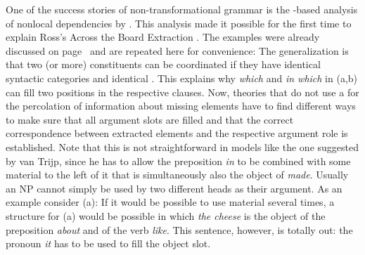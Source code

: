 One of the success stories of non-transformational grammar is the \slasch-based analysis of nonlocal dependencies
by \citet{Gazdar81}. This analysis made it possible for the first time to explain Ross's Across the Board
Extraction \citep{Ross67}. The examples were already discussed on
page~\pageref{ex-atb-gazdar} and are repeated here for convenience:
\eal\settowidth{}
\label{ex-atb-gazdar-two}
\zl
The generalization is that two (or more) constituents can be coordinated if they have identical
syntactic categories and identical \slashvs. This explains why \emph{which} and \emph{in which} in
(a,b) can fill two positions in the respective clauses. Now, theories that do not use a
\slashf for the percolation of information about missing elements have to find different ways to
make sure that all argument slots are filled and that the correct correspondence between extracted
elements and the respective argument role is established. Note that this is not straightforward in
models like the one suggested by van Trijp, since he has to allow the preposition \emph{in} to be
combined with some material to the left of it that is simultaneously also the object of
\emph{made}. Usually an NP cannot simply be used by two different heads as their argument. As an
example consider (a):
\eal
{}
\zl
If it would be possible to use material several times, a structure for (a) would be possible
in which \emph{the cheese} is the object of the preposition \emph{about} and of the verb
\emph{like}. This sentence, however, is totally out: the pronoun \emph{it} has to be used to fill
the object slot.

